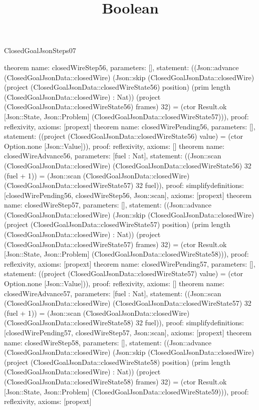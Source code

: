 \begin{lexlean}{ClosedGoalJsonSteps07}
\title{Boolean}
\begin{semanticmodule}
theorem{
 name: closedWireStep56, parameters: [],
 statement: ((Json::advance (ClosedGoalJsonData::closedWire) (Json::skip (ClosedGoalJsonData::closedWire) (project (ClosedGoalJsonData::closedWireState56) position) (prim length (ClosedGoalJsonData::closedWire) : Nat)) (project (ClosedGoalJsonData::closedWireState56) frames) 32) = (ctor Result.ok [Json::State, Json::Problem] (ClosedGoalJsonData::closedWireState57))), proof: reflexivity{}, axioms: [propext]
}
theorem{
 name: closedWirePending56, parameters: [],
 statement: ((project (ClosedGoalJsonData::closedWireState56) value) = (ctor Option.none [Json::Value])), proof: reflexivity{}, axioms: []
}
theorem{
 name: closedWireAdvance56, parameters: [fuel : Nat],
 statement: ((Json::scan (ClosedGoalJsonData::closedWire) (ClosedGoalJsonData::closedWireState56) 32 (fuel + 1)) = (Json::scan (ClosedGoalJsonData::closedWire) (ClosedGoalJsonData::closedWireState57) 32 fuel)), proof: simplify{definitions: [closedWirePending56, closedWireStep56, Json::scan]}, axioms: [propext]
}
theorem{
 name: closedWireStep57, parameters: [],
 statement: ((Json::advance (ClosedGoalJsonData::closedWire) (Json::skip (ClosedGoalJsonData::closedWire) (project (ClosedGoalJsonData::closedWireState57) position) (prim length (ClosedGoalJsonData::closedWire) : Nat)) (project (ClosedGoalJsonData::closedWireState57) frames) 32) = (ctor Result.ok [Json::State, Json::Problem] (ClosedGoalJsonData::closedWireState58))), proof: reflexivity{}, axioms: [propext]
}
theorem{
 name: closedWirePending57, parameters: [],
 statement: ((project (ClosedGoalJsonData::closedWireState57) value) = (ctor Option.none [Json::Value])), proof: reflexivity{}, axioms: []
}
theorem{
 name: closedWireAdvance57, parameters: [fuel : Nat],
 statement: ((Json::scan (ClosedGoalJsonData::closedWire) (ClosedGoalJsonData::closedWireState57) 32 (fuel + 1)) = (Json::scan (ClosedGoalJsonData::closedWire) (ClosedGoalJsonData::closedWireState58) 32 fuel)), proof: simplify{definitions: [closedWirePending57, closedWireStep57, Json::scan]}, axioms: [propext]
}
theorem{
 name: closedWireStep58, parameters: [],
 statement: ((Json::advance (ClosedGoalJsonData::closedWire) (Json::skip (ClosedGoalJsonData::closedWire) (project (ClosedGoalJsonData::closedWireState58) position) (prim length (ClosedGoalJsonData::closedWire) : Nat)) (project (ClosedGoalJsonData::closedWireState58) frames) 32) = (ctor Result.ok [Json::State, Json::Problem] (ClosedGoalJsonData::closedWireState59))), proof: reflexivity{}, axioms: [propext]
}
\end{semanticmodule}
\end{lexlean}
